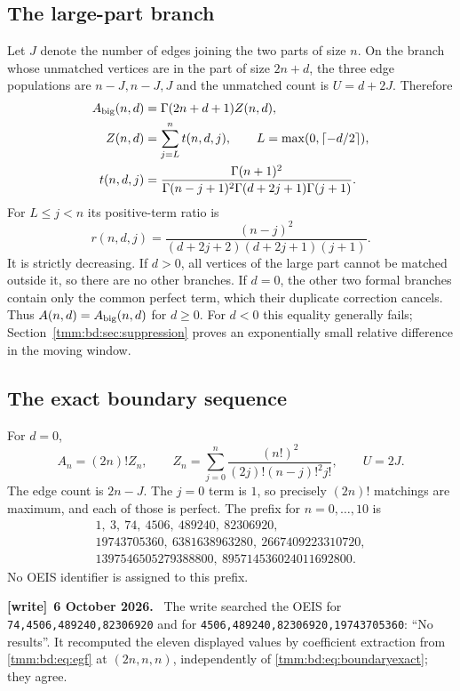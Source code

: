 \documentclass[11pt,letterpaper]{article}
\theoremstyle{remark}\newtheorem{remark}[theorem]{Remark}
\newcommand{\ceil}[1]{\left\lceil #1\right\rceil}
\newenvironment{writenote}[1][]{\par\smallskip\begingroup\small
 \noindent\textbf{[write]}\if\relax\detokenize{#1}\relax\else~\textbf{#1.}\fi\ }%
 {\par\endgroup\smallskip}
\begin{document}
\subsection{The large-part branch}
Let $J$ denote the number of edges joining the two parts of size $n$. On the branch whose unmatched vertices are in the part of size $2n+d$, the three edge populations are $n-J,n-J,J$ and the unmatched count is $U=d+2J$. Therefore
\begin{align}
 A_{\rm big}(n,d)&=\Gamma(2n+d+1)Z(n,d),\label{tmm:bd:eq:big}\\
 Z(n,d)&=\sum_{j=L}^{n}t(n,d,j),\qquad
 L=\max(0,\ceil{-d/2}),\label{tmm:bd:eq:Z}\\
 t(n,d,j)&=\frac{\Gamma(n+1)^2}
 {\Gamma(n-j+1)^2\Gamma(d+2j+1)\Gamma(j+1)}.\label{tmm:bd:eq:term}
\end{align}
For $L\le j<n$ its positive-term ratio is
\begin{equation}\label{tmm:bd:eq:ratio}
 r(n,d,j)=\frac{(n-j)^2}{(d+2j+2)(d+2j+1)(j+1)}.
\end{equation}
It is strictly decreasing. If $d>0$, all vertices of the large part cannot be matched outside it, so there are no other branches. If $d=0$, the other two formal branches contain only the common perfect term, which their duplicate correction cancels. Thus $A(n,d)=A_{\rm big}(n,d)$ for $d\ge0$. For $d<0$ this equality generally fails; Section~\ref{tmm:bd:sec:suppression} proves an exponentially small relative difference in the moving window.

\subsection{The exact boundary sequence}
For $d=0$,
\begin{equation}\label{tmm:bd:eq:boundaryexact}
 A_n=(2n)!Z_n,\qquad Z_n=\sum_{j=0}^n\frac{(n!)^2}{(2j)!(n-j)!^2j!},
 \qquad U=2J.
\end{equation}
The edge count is $2n-J$. The $j=0$ term is $1$, so precisely $(2n)!$ matchings are maximum, and each of those is perfect. The prefix for $n=0,\ldots,10$ is
\[
\begin{gathered}
 1,\ 3,\ 74,\ 4506,\ 489240,\ 82306920,\\
 19743705360,\ 6381638963280,\ 2667409223310720,\\
 1397546505279388800,\ 895714536024011692800.
\end{gathered}
\]
No OEIS identifier is assigned to this prefix.
\begin{writenote}[6 October 2026]
The write searched the OEIS for \texttt{74,4506,489240,82306920} and for \texttt{4506,489240,82306920,19743705360}: ``No results''. It recomputed the eleven displayed values by coefficient extraction from \eqref{tmm:bd:eq:egf} at $(2n,n,n)$, independently of \eqref{tmm:bd:eq:boundaryexact}; they agree.
\end{writenote}
\end{document}
